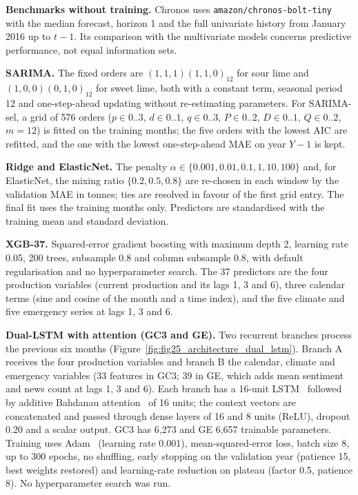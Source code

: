 \documentclass[forecasting,article,submit,moreauthors]{Definitions/mdpi}
\begin{document}
\textbf{Benchmarks without training.} Chronos uses \texttt{amazon/chronos-bolt-tiny} with the median forecast, horizon 1 and the full univariate history from January 2016 up to $t-1$. Its comparison with the multivariate models concerns predictive performance, not equal information sets.

\textbf{SARIMA.} The fixed orders are $(1,1,1)(1,1,0)_{12}$ for sour lime and $(1,0,0)(0,1,0)_{12}$ for sweet lime, both with a constant term, seasonal period 12 and one-step-ahead updating without re-estimating parameters. For SARIMA-sel, a grid of 576 orders ($p\in0..3$, $d\in0..1$, $q\in0..3$, $P\in0..2$, $D\in0..1$, $Q\in0..2$, $m=12$) is fitted on the training months; the five orders with the lowest AIC are refitted, and the one with the lowest one-step-ahead MAE on year $Y-1$ is kept.

\textbf{Ridge and ElasticNet.} The penalty $\alpha\in\{0.001,0.01,0.1,1,10,100\}$ and, for ElasticNet, the mixing ratio $\{0.2,0.5,0.8\}$ are re-chosen in each window by the validation MAE in tonnes; ties are resolved in favour of the first grid entry. The final fit uses the training months only. Predictors are standardised with the training mean and standard deviation.

\textbf{XGB-37.} Squared-error gradient boosting with maximum depth 2, learning rate 0.05, 200 trees, subsample 0.8 and column subsample 0.8, with default regularisation and no hyperparameter search. The 37 predictors are the four production variables (current production and its lags 1, 3 and 6), three calendar terms (sine and cosine of the month and a time index), and the five climate and five emergency series at lags 1, 3 and 6.

\textbf{Dual-LSTM with attention (GC3 and GE).} Two recurrent branches process the previous six months (Figure~\ref{fig:fig25_architecture_dual_lstm}). Branch A receives the four production variables and branch B the calendar, climate and emergency variables (33 features in GC3; 39 in GE, which adds mean sentiment and news count at lags 1, 3 and 6). Each branch has a 16-unit LSTM~\cite{hochreiter1997lstm} followed by additive Bahdanau attention~\cite{bahdanau2015neural} of 16 units; the context vectors are concatenated and passed through dense layers of 16 and 8 units (ReLU), dropout 0.20 and a scalar output. GC3 has 6,273 and GE 6,657 trainable parameters. Training uses Adam~\cite{kingma2015adam} (learning rate 0.001), mean-squared-error loss, batch size 8, up to 300 epochs, no shuffling, early stopping on the validation year (patience 15, best weights restored) and learning-rate reduction on plateau (factor 0.5, patience 8). No hyperparameter search was run.
\end{document}
